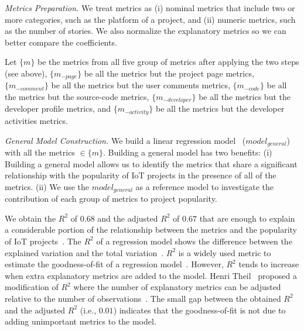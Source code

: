 \noindent\textit{Metrics Preparation.} We treat metrics as (i) nominal metrics that include two or more
categories, such as the platform of a project, and (ii) numeric
metrics, such as the number of stories. We also normalize the explanatory metrics so we can better compare the coefficients.

Let $\{m\}$ be the metrics from all five group of metrics after applying the two steps (see above), $\{m_{-page}\}$ be all the metrics but the project page metrics, $\{m_{-comment}\}$ be all the metrics but the user comments metrics, $\{m_{-code}\}$ be all the metrics but the source-code metrics, $\{m_{-developer}\}$ be all the metrics but the developer profile metrics, and $\{m_{-activity}\}$ be all the metrics but the developer activities metrics.

\vspace{0.1cm}

\noindent\textit{General Model Construction.}
We build a linear regression model~\cite{weisberg2005applied,lrm}
($model_{general}$) with all the metrics $\in\{m\}$. Building a general model has two benefits: (i) Building a general model allows us to identify the metrics that share a significant relationship with the popularity of IoT projects in the presence of all of the metrics. (ii) We use the $model_{general}$ as a reference model to investigate the contribution of each group of metrics to project popularity.

We obtain the $R^2$ of $0.68$ and the adjusted $R^2$ of $0.67$
that are enough to explain a considerable portion of the relationship between the metrics and the popularity of IoT projects~\cite{glantz1990primer,steel1960torrie,draper1998applied}.
The $R^2$ of a regression model shows the difference between the explained variation and the total variation~\cite{glantz1990primer}.
$R^2$ is a widely used metric to estimate the goodness-of-fit of a regression model~\cite{box1978statistics,kitchenham2002preliminary}. However, $R^2$ tends to increase when extra explanatory metrics are added to the model.
Henri Theil~\cite{theil1971applied} proposed a modification of $R^2$ where the number of explanatory metrics can be adjusted relative to the number of observations~\cite{theil1971applied}. The small gap between the obtained $R^2$ and the adjusted $R^2$ (i.e., $0.01$) indicates that the goodness-of-fit is not due to adding unimportant metrics to the model. 

